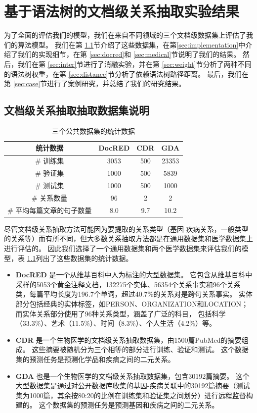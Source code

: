 \documentclass[bachelor]{thesis-uestc}
\begin{document}
\chapter{基于语法树的文档级关系抽取实验结果}
为了全面的评估我们的模型，我们在来自不同领域的三个文档级数据集上评估了我们的算法模型。
我们在第 \ref{sec:dataset}节介绍了这些数据集，在第\ref{sec:implementation}中介绍了我们的实现细节，在第 \ref{sec:docred}和 \ref{sec:medical}节说明了我们的结果。
然后，我们在第 \ref{sec:inter}节进行了消融实验，并在第 \ref{sec:weight}节分析了两种不同的语法树权重，在第 \ref{sec:distance}节分析了依赖语法树路径距离。
最后，我们在第 \ref{sec:case}节进行了案例研究，并总结了我们的研究结果。

\section{文档级关系抽取抽取数据集说明}\label{sec:dataset}

\begin{table}[h]
    \caption{三个公共数据集的统计数据}
    \begin{tabular}{cccc}
    \hline
    统计数据               & DocRED & CDR & GDA   \\ \hline
    \# 训练集                 & 3053   & 500 & 23353 \\
    \# 验证集                   & 1000   & 500 & 5839  \\
    \# 测试集                  & 1000   & 500 & 1000  \\
    \# 关系数量             & 96     & 2   & 2     \\
    \# 平均每篇文章的句子数量 & 8.0    & 9.7 & 10.2  \\ \hline
    \end{tabular}
    \label{table:datasets}
\end{table} 
尽管文档级关系抽取方法可能因为要提取的关系类型（基因-疾病关系，一般类型的关系等）而有所不同，但大多数关系抽取方法都是在通用数据集和医学数据集上进行评估的。
因此我们选择了一个通用数据集和两个医学数据集来评估我们的模型，表 \ref{table:datasets}列出了这些数据集的统计数据。
\begin{itemize}
    \item \textbf{DocRED} \cite{DOCRED} 是一个从维基百科中人为标注的大型数据集。
    它包含从维基百科中采样的5053个黄金注释文档，132275个实体、56354个关系事实和96个关系类，每篇平均长度为196.7个单词，超过40.7\%的关系对是跨句关系事实。
    实体部分包括经典的实体标签，如PERSON、ORGANIZATION和LOCATION；而实体关系部分使用了96种关系类型，涵盖了广泛的科目， 包括科学（33.3\%）、艺术（11.5\%）、时间（8.3\%）、个人生活（4.2\%）等。
    \item \textbf{CDR} \cite{li2016biocreative} 是一个生物医学的文档级关系抽取数据集，由1500篇PubMed的摘要组成。
    这些摘要被随机分为三个相等的部分进行训练、验证和测试。
    这个数据集的预测任务是预测化学品和疾病之间的二元关系。
    \item \textbf{GDA} \cite{GDA} 
    也是一个生物医学的文档级关系抽取数据集，包含30192篇摘要。
    这个大型数据集是通过对公开数据库收集的基因-疾病关联中的30192篇摘要（测试集为1000篇，其余按80:20的比例在训练集和验证集之间划分）进行远程监督构建的。
    这个数据集的预测任务是预测基因和疾病之间的二元关系。
\end{itemize}
\end{document}
